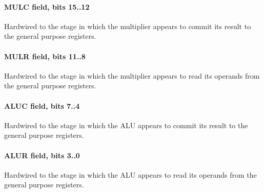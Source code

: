 \paragraph*{MULC field, bits 15..12}
Hardwired to the stage in which the multiplier appears to commit its result to
the general purpose registers.
\paragraph*{MULR field, bits 11..8}
Hardwired to the stage in which the multiplier appears to read its operands from
the general purpose registers.
\paragraph*{ALUC field, bits 7..4}
Hardwired to the stage in which the ALU appears to commit its result to the
general purpose registers.
\paragraph*{ALUR field, bits 3..0}
Hardwired to the stage in which the ALU appears to read its operands from the
general purpose registers.
